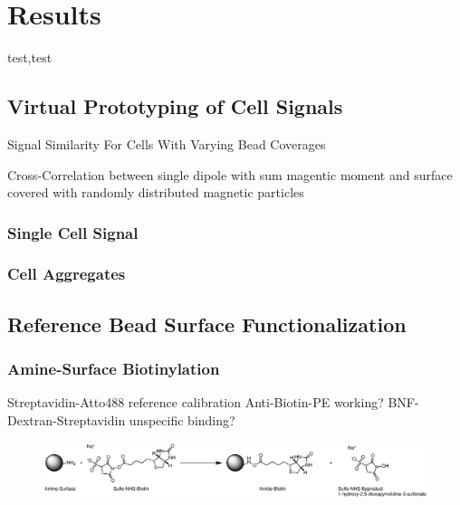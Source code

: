 \chapter{Results}
test,test

\section{Virtual Prototyping of Cell Signals}
Signal Similarity For Cells With Varying Bead Coverages

Cross-Correlation between single dipole with sum magentic moment and surface covered with randomly distributed magnetic particles

\subsection{Single Cell Signal}

\subsection{Cell Aggregates}

\section{Reference Bead Surface Functionalization}

\subsection{Amine-Surface Biotinylation}
Streptavidin-Atto488 reference calibration
Anti-Biotin-PE working?
BNF-Dextran-Streptavidin unspecific binding?



\begin{figure}[htb!]
	\centering
	\includegraphics[width=\textwidth]{./Ressources/Chemistry/Sulfo-NHS.eps}
	\label{fig:Chem:NH2-NHS}
\end{figure}





